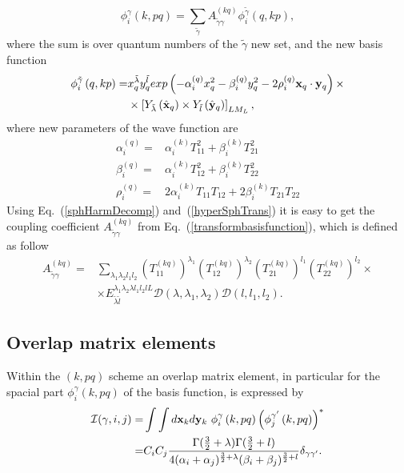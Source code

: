 \documentclass[12pt,a4paper,twoside]{article}
\begin{document}
  \begin{equation}
 \label{transformbasisfunction}
 \phi_{i}^{\gamma}\left(k, pq \right) = \sum_{\tilde{\gamma}} A_{\tilde{\gamma}\gamma}^{(kq)}
  \phi_{i}^{\tilde{\gamma} } \left(q, kp \right) ,
 \end{equation}
where the sum is over quantum numbers of the $ \tilde {\gamma} $ new set, and the new basis function 
\begin{align}
\phi_{i}^{\tilde{\gamma} } \left(q, kp \right)  =  &
 x_{q}^{\tilde{\lambda}} y_{q}^{\tilde{l}} exp\left(- \alpha^{(q)}_{i} x_{q}^{2} - \beta^{(q)}_{i}  y_{q}^{2} - 2 \rho^{(q)}_i {\bf x}_{q} \cdot {\bf y}_{q}  \right) 
\times  \nonumber \\ 
&\times  \left[ Y_{\tilde{\lambda}} \left(  \hat{ \bf x}_q \right) \times Y_{\tilde{l}} \left( \hat{\bf y}_q \right) \right]_{LM_L},
\label{newBasis}
\end{align}
where new parameters of the wave function are
\begin{align}
\alpha^{(q)}_{i} =& \alpha^{(k)}_{i} T_{11}^2 + \beta^{(k)}_{i} T_{21}^2 
\nonumber \\
\beta^{(q)}_{i} =& \alpha^{(k)}_{i} T_{12}^2 + \beta^{(k)}_{i} T_{22}^2 
\nonumber \\
\rho^{(q)}_{i} =& 2 \alpha^{(k)}_{i} T_{11} T_{12} + 2 \beta^{(k)}_{i} T_{21}  T_{22} 
\end{align}
 Using Eq.~(\ref{sphHarmDecomp}) and~(\ref{hyperSphTrans}) it is easy to get the coupling coefficient $ A_{\tilde{\gamma} \gamma}^{(kq)} $ from Eq.~(\ref{transformbasisfunction}), which is defined as follow 
 \begin{align}
A_{\tilde{\gamma}\gamma}^{(kq)}  = & \sum_{\lambda_1 \lambda_2 l_1 l_2} 
\left(T_{11}^{(kq)} \right)^{\lambda_1} 
\left(T_{12}^{(kq)} \right)^{\lambda_2} 
\left(T_{21}^{(kq)} \right)^{l_1} 
\left(T_{22}^{(kq)} \right)^{l_2} 
\times 
\\
& \times {E}^{\lambda_1 \lambda_2 \lambda l_1 l_2 l L}_{\tilde{\lambda} \tilde{l} } \mathcal{D}(\lambda,\lambda_1,\lambda_2) \mathcal{D}(l,l_1,l_2).   \nonumber 
\end{align}

\subsection{Overlap matrix elements}
Within the $\left(k, pq \right)$ scheme an overlap matrix element, in particular for the spacial part $ \phi_{i}^{\gamma}\left(k, pq \right)$ of the basis function, is expressed by
\begin{align}
\mathcal{I}(\gamma,i,j)=& \int \int d{\bf x}_k d{\bf y}_k ~\phi_{i}^{\gamma}\left(k, pq \right) \left( \phi_{j}^{\gamma^{\prime}}\left(k, pq \right) \right)^{*} \nonumber \\
= & C_i C_j \frac{\Gamma(\frac{3}{2}+\lambda)\Gamma(\frac{3}{2}+l)}{4 (\alpha_i+\alpha_j)^{\frac{3}{2}+\lambda}(\beta_i+\beta_j)^{\frac{3}{2}+l}} \delta_{\gamma \gamma^{\prime}}.
\end{align}
\end{document}
